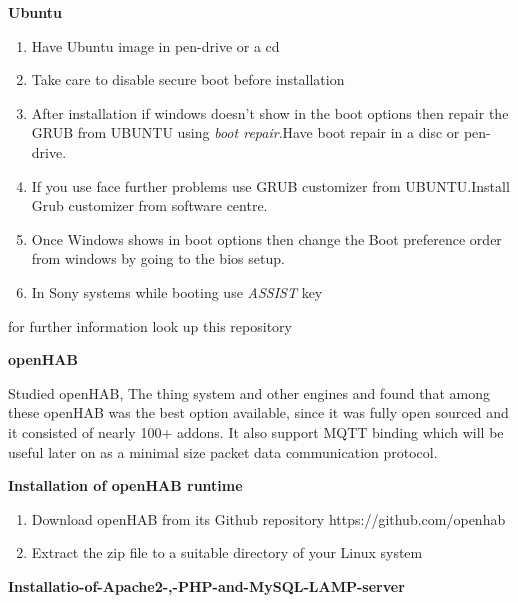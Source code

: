 \documentclass[16pt]{article}
\begin{document}
\begin{enumerate}
 
{\Large\item\textbf{Ubuntu}}
\hfill
  \begin{enumerate}
 
  \item
    Have Ubuntu image in pen-drive or a cd
  \item
    Take care to disable secure boot before installation
  \item
    After installation if windows doesn't show in the boot options then
    repair the GRUB from UBUNTU using \emph{boot repair}.Have boot repair in a disc or pen-drive.
  \item
    If you use face further problems use GRUB customizer from UBUNTU.Install Grub customizer from software centre.
  \item
    Once Windows shows in boot options then change the Boot preference
    order from windows by going to the bios setup.
  \item
    In Sony systems while booting use \emph{ASSIST} key
  \end{enumerate}
  
for further information look up this repository 
  
\hfill
{\Large\item\textbf{openHAB}}



Studied openHAB, The thing system and other engines and found that among these openHAB was the best option available, since it was fully open sourced and it
consisted of nearly 100+ addons. It also support MQTT binding which will be useful later on as a minimal size packet data communication protocol.

\hfill

\textbf{Installation of openHAB runtime}

\begin{enumerate}

  \item Download openHAB from its Github repository https://github.com/openhab
  \item Extract the zip file to a suitable directory of your Linux system

  \end{enumerate}
  
\hfill

{\Large\item\textbf{Installatio-of-Apache2-,-PHP-and-MySQL-LAMP-server}} 


\end{enumerate}
\end{document}
